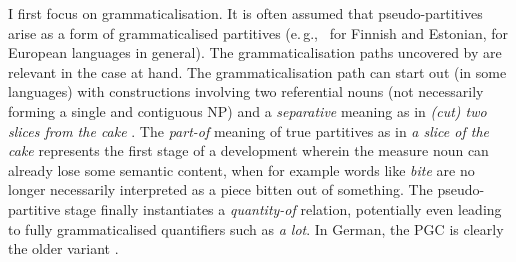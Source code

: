 \documentclass[USenglish]{article}
\newcommand{\eg}{e.\,g.,}
\begin{document}
I first focus on grammaticalisation.
It is often assumed that pseudo-partitives arise as a form of grammaticalised partitives (\eg\ \citealp[536--539]{Koptjevskaja2001} for Finnish and Estonian, \citealp[559]{Koptjevskaja2001} for European languages in general).
%
%
%
%
The grammaticalisation paths uncovered by \citet[esp.\ 526--530]{Koptjevskaja2001} are relevant in the case at hand.
The grammaticalisation path can start out (in some languages) with constructions involving two referential nouns (not necessarily forming a single and contiguous NP) and a \textit{separative} meaning as in \textit{(cut) two slices from the cake} \citep[535]{Koptjevskaja2001}.
The \textit{part-of} meaning of true partitives as in \textit{a slice of the cake} represents the first stage of a development wherein the measure noun can already lose some semantic content, when for example words like \textit{bite} are no longer necessarily interpreted as a piece bitten out of something.
The pseudo-partitive stage finally instantiates a \textit{quantity-of} relation, potentially even leading to fully grammaticalised quantifiers such as \textit{a lot}.
In German, the PGC is clearly the older variant \citep{Zimmer2015}.
\end{document}
